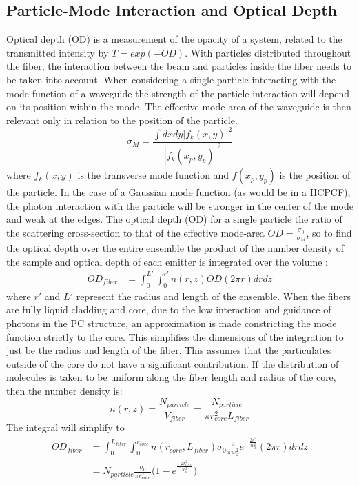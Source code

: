 \subsection{Particle-Mode Interaction and Optical Depth}
Optical depth (OD) is a measurement of the opacity of a system, related to the transmitted intensity by $T = exp(-OD)$. With particles distributed throughout the fiber, the interaction between the beam and particles inside the fiber needs to be taken into account. When considering a single particle interacting with the mode function of a waveguide the strength of the particle interaction will depend on its position within the mode\cite{domokos, mazoni}. The effective mode area of the waveguide is then relevant only in relation to the position of the particle. 
\begin{equation}
	\sigma_M = \frac{\int dxdy|f_k(x, y)|^2}{|f_k(x_p, y_p)|^2}
\end{equation}
where $f_k(x,y)$ is the transverse mode function and $f(x_p,y_p )$ is the position of the particle. In the case of a Gaussian mode function (as would be in a HCPCF), the photon interaction with the particle will be stronger in the center of the mode and weak at the edges. The optical depth (OD) for a single particle the ratio of the scattering cross-section to that of the effective mode-area $OD =\frac{\sigma_0}{\sigma_M}$, so to find the optical depth over the entire ensemble the product of the number density of the sample and optical depth of each emitter is integrated over the volume :
\begin{equation}
	\begin{aligned}
		OD_{fiber} &= \int^{L'}_0 \int^{r'}_0 n(r, z)OD(2\pi r) dr dz 
	\end{aligned}
\end{equation}
where $r'$ and $L'$ represent the radius and length of the ensemble.  When the fibers are fully liquid cladding and core, due to the low interaction and guidance of photons in the PC structure, an approximation is made constricting the mode function strictly to the core. This simplifies the dimensions of the integration to just be the radius and length of the fiber. This assumes that the particulates outside of the core do not have a significant contribution.  If the distribution of molecules is taken to be uniform along the fiber length and radius of the core, then the number density is: 
\begin{equation}
	n(r, z) = \frac{N_{particle}}{V_{fiber}} = \frac{N_{particle}}{\pi r_{core}^2L_{fiber}} 
\end{equation}
The integral will simplify to
\begin{equation}
	\begin{aligned}
		OD_{fiber} &= \int^{L_{fiber}}_0 \int^{r_{core}}_0  n(r_{core}, L_{fiber})\sigma_0 \frac{2}{\pi w_0^2}e^{-\frac{2r^2}{w_0^2}}(2\pi r) dr dz\\
		&= N_{particle}\frac{\sigma_0}{\pi r^2_{core}}\big(1-e^{\frac{-2r_{core}^2}{w_0^2}}\big)
	\label{OD}
	\end{aligned}
\end{equation}

